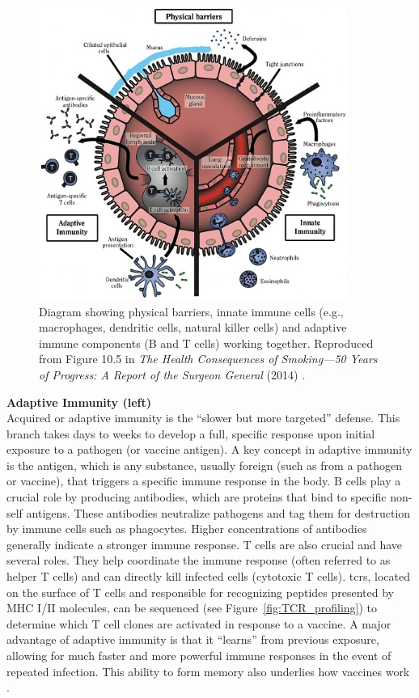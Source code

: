 \documentclass[12pt,a4paper]{report}
\begin{document}
\begin{figure}[H]
  \centering
  \includegraphics[width=0.9\textwidth]{images/Diagram_of_innate_and_adaptive_immunity.jpeg}
  \caption[Diagram of Innate and Adaptive Immunity]{Diagram showing physical barriers, innate immune cells (e.g., macrophages, dendritic cells, natural killer cells) and adaptive immune components (B and T cells) working together. Reproduced from Figure 10.5 in \emph{The Health Consequences of Smoking—50 Years of Progress: A Report of the Surgeon General} (2014) \cite{smoking2014}.}
  \label{fig:immunity}
\end{figure}
\noindent
\textbf{Adaptive Immunity (left)}\\
Acquired or adaptive immunity is the “slower but more targeted” defense. This branch takes days to weeks to develop a full, specific response upon initial exposure to a pathogen (or vaccine antigen). A key concept in adaptive immunity is the antigen, which is any substance, usually foreign (such as from a pathogen or vaccine), that triggers a specific immune response in the body. B cells play a crucial role by producing antibodies, which are proteins that bind to specific non-self antigens. These antibodies neutralize pathogens and tag them for destruction by immune cells such as phagocytes.
Higher concentrations of antibodies generally indicate a stronger immune response. T cells are also crucial and have several roles. They help coordinate the immune response (often referred to as helper T cells) and can directly kill infected cells (cytotoxic T cells). \glspl{tcr}, located on the surface of T cells and responsible for recognizing peptides presented by MHC I/II molecules, can be sequenced (see Figure~\ref{fig:TCR_profiling}) to determine which T cell clones are activated in response to a vaccine. A major advantage of adaptive immunity is that it “learns” from previous exposure, allowing for much faster and more powerful immune responses in the event of repeated infection. This ability to form memory also underlies how vaccines work \cite{janeway2001immunobiology}.
\end{document}
